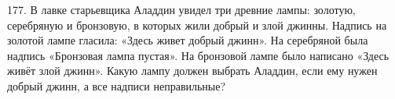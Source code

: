177. В лавке старьевщика Аладдин увидел три древние лампы: золотую, серебряную и бронзовую, в которых жили добрый и злой джинны. Надпись на золотой лампе гласила: «Здесь живет добрый джинн». На серебряной была надпись «Бронзовая лампа пустая». На бронзовой лампе было написано «Здесь живёт злой джинн». Какую лампу должен выбрать Аладдин, если ему нужен добрый джинн, а все надписи неправильные?\\
